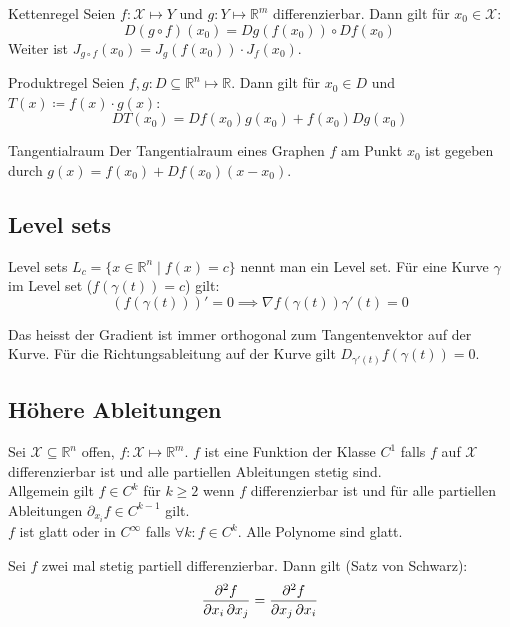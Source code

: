 \documentclass[a4paper,10pt]{article}
\def\R{\mathbb{R}}
\def\X{\mathcal{X}}
\begin{document}
\begin{subbox}{Kettenregel}
  Seien $f: \mathcal{X} \mapsto Y$ und $g: Y \mapsto \R^m$ differenzierbar. Dann gilt für $x_0 \in \mathcal{X}$:
  $$D(g \circ f)(x_0) = Dg(f(x_0)) \circ Df(x_0)$$
  Weiter ist \(J_{g \circ f}(x_0) = J_g(f(x_0)) \cdot J_f(x_0)\).
\end{subbox}

\begin{subbox}{Produktregel}
  Seien $f, g: D \subseteq \R^n \mapsto \R$. Dann gilt für $x_0 \in D$ und $T(x) \coloneqq f(x) \cdot g(x)$:
  $$DT(x_0) = Df(x_0) g(x_0) + f(x_0) Dg(x_0)$$
\end{subbox}

\begin{subbox}{Tangentialraum}
  Der Tangentialraum eines Graphen \(f\) am Punkt \(x_0\) ist gegeben durch \(g(x) = f(x_0) + Df(x_0)(x-x_0)\).
\end{subbox}

\subsection{Level sets}

\begin{mainbox}{Level sets}
  $L_c = \{ x \in \mathbb{R}^n \mid f(x) = c \}$ nennt man ein Level set.
  Für eine Kurve $\gamma$ im Level set ($f(\gamma(t)) = c$) gilt:
  $$(f(\gamma(t)))' = 0 \implies \nabla f(\gamma(t)) \gamma'(t) = 0$$
\end{mainbox}

Das heisst der Gradient ist immer orthogonal zum Tangentenvektor auf der Kurve. Für die Richtungsableitung auf der Kurve gilt $D_{\gamma'(t)}f(\gamma(t)) = 0$.

\subsection{Höhere Ableitungen}
Sei \(\X \subseteq \R^n\) offen, \(f: \X \mapsto \R^m\). \(f\) ist eine Funktion der Klasse \(C^1\) falls \(f\) auf \(\X\) differenzierbar ist und alle partiellen Ableitungen stetig sind. \\
Allgemein gilt \(f \in C^k\) für \(k \ge 2\) wenn \(f\) differenzierbar ist und für alle partiellen Ableitungen \(\partial_{x_i} f \in C^{k-1}\) gilt. \\
\(f\) ist glatt oder in \(C^\infty\) falls \(\forall k: f \in C^k \). Alle Polynome sind glatt.

Sei $f$ zwei mal stetig partiell differenzierbar. Dann gilt (Satz von Schwarz):
$$\pdv{f}{x_i, x_j} = \pdv{f}{ x_j, x_i}$$
\end{document}
